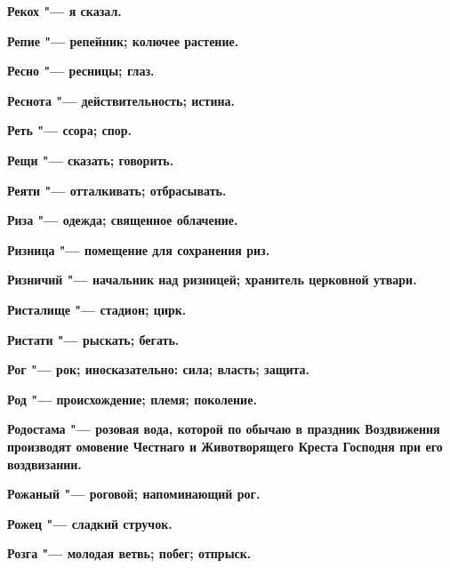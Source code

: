\bfseries Рекох \normalfont{} "--- я сказал. 




\bfseries Репие \normalfont{} "--- репейник; колючее растение. 




\bfseries Ресно \normalfont{} "--- ресницы; глаз. 




\bfseries Реснота \normalfont{} "--- действительность; истина. 




\bfseries Реть \normalfont{} "--- ссора; спор. 




\bfseries Рещи \normalfont{} "--- сказать; говорить. 




\bfseries Реяти \normalfont{} "--- отталкивать; отбрасывать. 




\bfseries Риза \normalfont{} "--- одежда; священное облачение. 




\bfseries Ризница \normalfont{} "--- помещение для сохранения риз. 




\bfseries Ризничий \normalfont{} "--- начальник над ризницей; хранитель церковной утвари. 




\bfseries Ристалище \normalfont{} "--- стадион; цирк. 




\bfseries Ристати \normalfont{} "--- рыскать; бегать. 




\bfseries Рог \normalfont{} "--- рок; иносказательно: сила; власть; защита. 




\bfseries Род \normalfont{} "--- происхождение; племя; поколение. 




\bfseries Родостама \normalfont{} "--- розовая вода, которой по обычаю в праздник Воздвижения производят омовение Честнаго и Животворящего Креста Господня при его воздвизании. 




\bfseries Рожаный \normalfont{} "--- роговой; напоминающий рог. 




\bfseries Рожец \normalfont{} "--- сладкий стручок. 




\bfseries Розга \normalfont{} "--- молодая ветвь; побег; отпрыск. 




